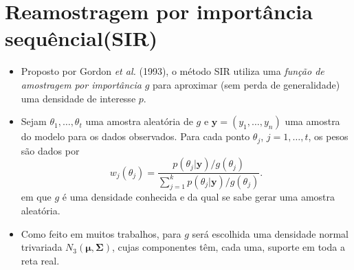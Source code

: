 \documentclass[9pt]{beamer}
\begin{document}
\section{Reamostragem por importância sequêncial(SIR)}
\begin{frame}
\begin{itemize}
\justifying	
\item Proposto por Gordon \textit{et al.} (1993), o método SIR utiliza uma \textit{função de amostragem por importância} $g$ para aproximar (sem perda de generalidade) uma densidade de interesse $p$.

\item Sejam $\theta_1, \ldots, \theta_t$ uma amostra aleatória de $g$ e $\bm{y} = (y_1, \ldots, y_n)$ uma amostra do modelo para os dados observados. Para cada ponto $\theta_j$, $j = 1, \ldots, t$, os pesos são dados por
\begin{equation}\label{eq:sir_wei}
w_j(\theta_j) = \dfrac{p(\theta_j | \bm{y}) / g(\theta_j)}{\sum_{j=1}^{k} p(\theta_j | \bm{y}) / g(\theta_j)}.
\end{equation}
em que $g$  é uma densidade conhecida e da qual se sabe gerar uma amostra aleatória. 
\item Como feito em muitos trabalhos, para $g$ será escolhida uma densidade normal trivariada $N_3(\bm{\mu}, \bm{\Sigma})$, cujas componentes têm, cada uma, suporte em toda a reta real.
\end{itemize}
\end{frame}
\end{document}
